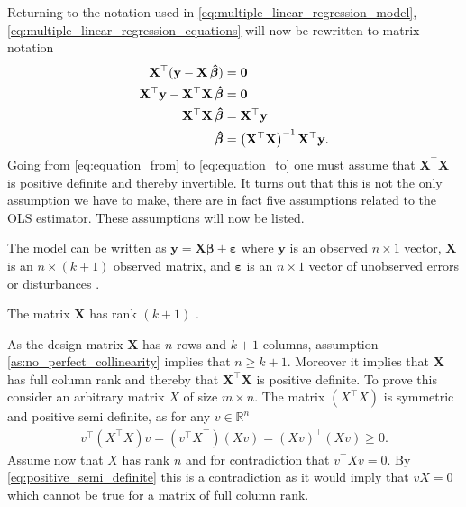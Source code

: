 Returning to the notation used in \eqref{eq:multiple_linear_regression_model}, \eqref{eq:multiple_linear_regression_equations} will now be rewritten to matrix notation
\begin{align}
    \mathbf{X}^\top(\mathbf{y} - \mathbf{X}\operatorname{\boldsymbol{\hat{\beta}}}) &= \mathbf{0} \nonumber\\
    \mathbf{X}^\top\mathbf{y} - \mathbf{X}^\top\mathbf{X}\operatorname{\boldsymbol{\hat{\beta}}} &= \mathbf{0}\nonumber\\
    \mathbf{X}^\top\mathbf{X}\operatorname{\boldsymbol{\hat{\beta}}} &= \mathbf{X}^\top\mathbf{y}\label{eq:equation_from} \\
    \operatorname{\boldsymbol{\hat{\beta}}} &= \left(\mathbf{X}^\top\mathbf{X}\right)^{-1}\mathbf{X}^\top\mathbf{y}.\label{eq:equation_to}
\end{align}
Going from \eqref{eq:equation_from} to \eqref{eq:equation_to} one must assume that $\mathbf{X}^\top\mathbf{X}$ is positive definite and thereby invertible.
It turns out that this is not the only assumption we have to make, there are in fact five assumptions related to the OLS estimator.
These assumptions will now be listed.
\begin{assumption}\label{as:linear_in_the_parameters}
    The model can be written as $\mathbf{y} = \mathbf{X}\boldsymbol{\beta} + \boldsymbol{\varepsilon}$ where $\mathbf{y}$ is an observed $n \times 1$ vector, $\mathbf{X}$ is an $n \times (k + 1)$ observed matrix, and $\boldsymbol{\varepsilon}$ is an $n \times 1$ vector of unobserved errors or disturbances \cite[p. 809]{Wooldridge2012}.
\end{assumption}
\begin{assumption}\label{as:no_perfect_collinearity}
    The matrix $\mathbf{X}$ has rank $(k + 1)$ \cite[p. 810]{Wooldridge2012}.
\end{assumption}
As the design matrix $\mathbf{X}$ has $n$ rows and $k + 1$ columns, assumption \ref{as:no_perfect_collinearity} implies that $n \geq k + 1$.
Moreover it implies that $\mathbf{X}$ has full column rank and thereby that $\mathbf{X}^\top\mathbf{X}$ is positive definite.
To prove this consider an arbitrary matrix $X$ of size $m \times n$.
The matrix $(X^\top X)$ is symmetric and positive semi definite, as for any $v \in \mathbb{R}^n$
\begin{align}\label{eq:positive_semi_definite}
v^\top (X^\top X) v = (v^\top X^\top) (X v) = (X v)^\top (X v) \geq 0.
\end{align}
Assume now that $X$ has rank $n$ and for contradiction that $v^\top X v = 0$.
By \eqref{eq:positive_semi_definite} this is a contradiction as it would imply that $vX = 0$ which cannot be true for a matrix of full column rank.
